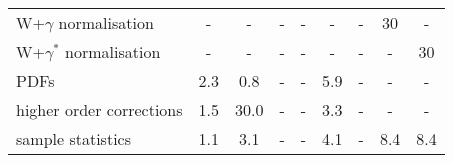 \begin{table}[!ht]
\begin{center}
{\begin{tabular}{l|c|c|c|c|c|c|c|c}
W+$\gamma$ normalisation     &   - &    - &  -                &  -                & -   &  -                & 30  &  -  \\
W+$\gamma^{*}$ normalisation &   - &    - &  -                &  -                & -   &  -                & -   & 30  \\
PDFs                         & 2.3 &  0.8 &  -                &  -                & 5.9 &  -                & -   &  -  \\
higher order corrections     & 1.5 & 30.0 &  -                &  -                & 3.3 &  -                & -   &  -  \\
sample statistics            & 1.1 &  3.1 &  -                &  -                & 4.1 &  -                & 8.4 & 8.4 \\
\hline
\end{tabular}}
\end{center}
\end{table}
